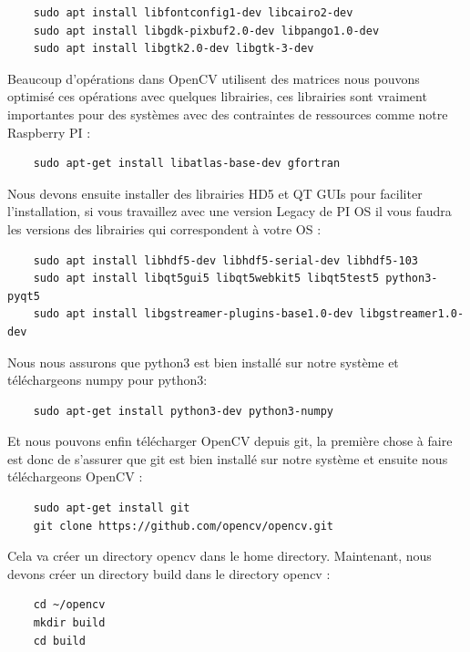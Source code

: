 \documentclass[
	a4paper,									%
	11pt,										%
	twoside,									%
	openright,									%
	notitlepage,									%
	parskip=half,								%
]{scrreprt}										%
\begin{document}
\begin{verbatim}
	sudo apt install libfontconfig1-dev libcairo2-dev
	sudo apt install libgdk-pixbuf2.0-dev libpango1.0-dev
	sudo apt install libgtk2.0-dev libgtk-3-dev
\end{verbatim}

\newpage
Beaucoup d'opérations dans OpenCV utilisent des matrices nous pouvons optimisé ces opérations avec quelques librairies, 
ces librairies sont vraiment importantes pour des systèmes avec des contraintes de ressources comme notre Raspberry PI : 
\begin{verbatim}
	sudo apt-get install libatlas-base-dev gfortran
\end{verbatim}

Nous devons ensuite installer des librairies HD5 et QT GUIs pour faciliter l'installation, 
si vous travaillez avec une version Legacy de PI OS il vous faudra les versions des librairies qui 
correspondent à votre OS : 

\begin{verbatim}
	sudo apt install libhdf5-dev libhdf5-serial-dev libhdf5-103
	sudo apt install libqt5gui5 libqt5webkit5 libqt5test5 python3-pyqt5
	sudo apt install libgstreamer-plugins-base1.0-dev libgstreamer1.0-dev
\end{verbatim}

Nous nous assurons que python3 est bien installé sur notre système et téléchargeons numpy pour python3: 

\begin{verbatim}
	sudo apt-get install python3-dev python3-numpy
\end{verbatim}

Et nous pouvons enfin télécharger OpenCV depuis git, la première chose à faire est donc de s'assurer 
que git est bien installé sur notre système et ensuite nous téléchargeons OpenCV : 

\begin{verbatim}
	sudo apt-get install git
	git clone https://github.com/opencv/opencv.git
\end{verbatim}

Cela va créer un directory opencv dans le home directory. Maintenant, nous devons créer un directory build 
dans le directory opencv : 

\begin{verbatim}
	cd ~/opencv
	mkdir build
	cd build
\end{verbatim}
\end{document}
